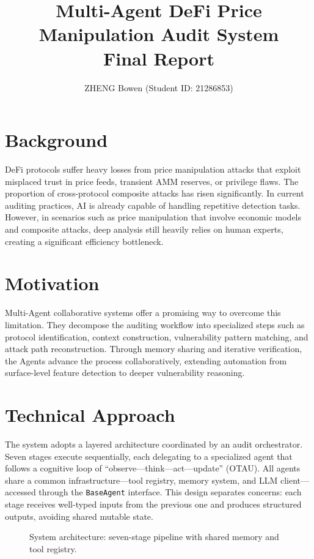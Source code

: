 \documentclass[10pt]{article}
\title{Multi-Agent DeFi Price Manipulation Audit System\\ Final Report}
\author{ZHENG Bowen (Student ID: 21286853)}
\date{}
\begin{document}
\maketitle

\section{Background}
DeFi protocols suffer heavy losses from price manipulation attacks that exploit misplaced trust in price feeds, transient AMM reserves, or privilege flaws. The proportion of cross-protocol composite attacks has risen significantly. In current auditing practices, AI is already capable of handling repetitive detection tasks. However, in scenarios such as price manipulation that involve economic models and composite attacks, deep analysis still heavily relies on human experts, creating a significant efficiency bottleneck.

\section{Motivation}
Multi-Agent collaborative systems offer a promising way to overcome this limitation. They decompose the auditing workflow into specialized steps such as protocol identification, context construction, vulnerability pattern matching, and attack path reconstruction. Through memory sharing and iterative verification, the Agents advance the process collaboratively, extending automation from surface-level feature detection to deeper vulnerability reasoning.

\section{Technical Approach}

The system adopts a layered architecture coordinated by an audit orchestrator. Seven stages execute sequentially, each delegating to a specialized agent that follows a cognitive loop of ``observe---think---act---update'' (OTAU). All agents share a common infrastructure---tool registry, memory system, and LLM client---accessed through the \texttt{BaseAgent} interface. This design separates concerns: each stage receives well-typed inputs from the previous one and produces structured outputs, avoiding shared mutable state.

\begin{figure}[H]
    \centering
    \caption{System architecture: seven-stage pipeline with shared memory and tool registry.}
    \label{fig:arch}
\end{figure}
\end{document}
